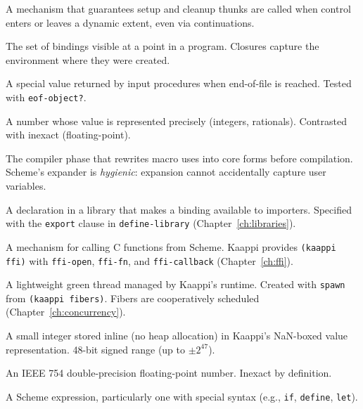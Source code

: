 \begin{description}[leftmargin=2em, style=nextline]
\item[dynamic-wind]
A mechanism that guarantees setup and cleanup thunks are called when control enters or leaves a dynamic extent, even via continuations.

\item[environment]
The set of bindings visible at a point in a program. Closures capture the environment where they were created.

\item[eof object]
A special value returned by input procedures when end-of-file is reached. Tested with \texttt{eof-object?}.

\item[exact]
A number whose value is represented precisely (integers, rationals). Contrasted with inexact (floating-point).

\item[expander]
The compiler phase that rewrites macro uses into core forms before compilation. Scheme's expander is \emph{hygienic}: expansion cannot accidentally capture user variables.

\item[export]
A declaration in a library that makes a binding available to importers. Specified with the \texttt{export} clause in \texttt{define-library} (Chapter~\ref{ch:libraries}).

\item[FFI (Foreign Function Interface)]
A mechanism for calling C functions from Scheme. Kaappi provides \texttt{(kaappi ffi)} with \texttt{ffi-open}, \texttt{ffi-fn}, and \texttt{ffi-callback} (Chapter~\ref{ch:ffi}).

\item[fiber]
A lightweight green thread managed by Kaappi's runtime. Created with \texttt{spawn} from \texttt{(kaappi fibers)}. Fibers are cooperatively scheduled (Chapter~\ref{ch:concurrency}).

\item[fixnum]
A small integer stored inline (no heap allocation) in Kaappi's NaN-boxed value representation. 48-bit signed range (up to $\pm 2^{47}$).

\item[flonum]
An IEEE 754 double-precision floating-point number. Inexact by definition.

\item[form]
A Scheme expression, particularly one with special syntax (e.g., \texttt{if}, \texttt{define}, \texttt{let}).


\end{description}
